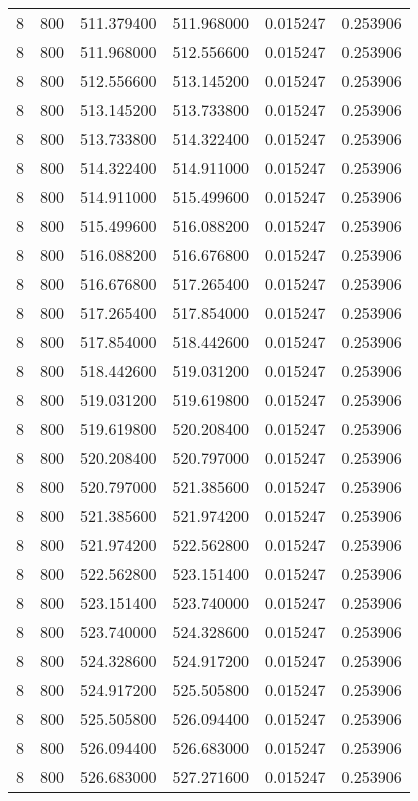 \begin{longtable}{rrrrrr}
8 & 800 & 511.379400 & 511.968000 & 0.015247 & 0.253906 \\
8 & 800 & 511.968000 & 512.556600 & 0.015247 & 0.253906 \\
8 & 800 & 512.556600 & 513.145200 & 0.015247 & 0.253906 \\
8 & 800 & 513.145200 & 513.733800 & 0.015247 & 0.253906 \\
8 & 800 & 513.733800 & 514.322400 & 0.015247 & 0.253906 \\
8 & 800 & 514.322400 & 514.911000 & 0.015247 & 0.253906 \\
8 & 800 & 514.911000 & 515.499600 & 0.015247 & 0.253906 \\
8 & 800 & 515.499600 & 516.088200 & 0.015247 & 0.253906 \\
8 & 800 & 516.088200 & 516.676800 & 0.015247 & 0.253906 \\
8 & 800 & 516.676800 & 517.265400 & 0.015247 & 0.253906 \\
8 & 800 & 517.265400 & 517.854000 & 0.015247 & 0.253906 \\
8 & 800 & 517.854000 & 518.442600 & 0.015247 & 0.253906 \\
8 & 800 & 518.442600 & 519.031200 & 0.015247 & 0.253906 \\
8 & 800 & 519.031200 & 519.619800 & 0.015247 & 0.253906 \\
8 & 800 & 519.619800 & 520.208400 & 0.015247 & 0.253906 \\
8 & 800 & 520.208400 & 520.797000 & 0.015247 & 0.253906 \\
8 & 800 & 520.797000 & 521.385600 & 0.015247 & 0.253906 \\
8 & 800 & 521.385600 & 521.974200 & 0.015247 & 0.253906 \\
8 & 800 & 521.974200 & 522.562800 & 0.015247 & 0.253906 \\
8 & 800 & 522.562800 & 523.151400 & 0.015247 & 0.253906 \\
8 & 800 & 523.151400 & 523.740000 & 0.015247 & 0.253906 \\
8 & 800 & 523.740000 & 524.328600 & 0.015247 & 0.253906 \\
8 & 800 & 524.328600 & 524.917200 & 0.015247 & 0.253906 \\
8 & 800 & 524.917200 & 525.505800 & 0.015247 & 0.253906 \\
8 & 800 & 525.505800 & 526.094400 & 0.015247 & 0.253906 \\
8 & 800 & 526.094400 & 526.683000 & 0.015247 & 0.253906 \\
8 & 800 & 526.683000 & 527.271600 & 0.015247 & 0.253906 \\

\end{longtable}
